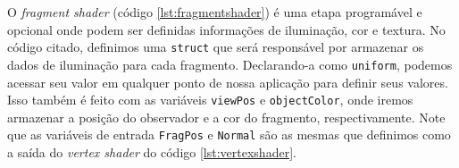 O \textit{fragment shader} (código \ref{lst:fragmentshader}) é uma etapa programável e opcional onde podem ser definidas informações de iluminação, cor e textura. No código citado, definimos uma \lstinline{struct} que será responsável por armazenar os dados de iluminação para cada fragmento. Declarando-a como \lstinline{uniform}, podemos acessar seu valor em qualquer ponto de nossa aplicação para definir seus valores. Isso também é feito com as variáveis \lstinline{viewPos} e \lstinline{objectColor}, onde iremos armazenar a posição do observador e a cor do fragmento, respectivamente. Note que as variáveis de entrada \lstinline{FragPos} e \lstinline{Normal} são as mesmas que definimos como a saída do \textit{vertex shader} do código \ref{lst:vertexshader}.




